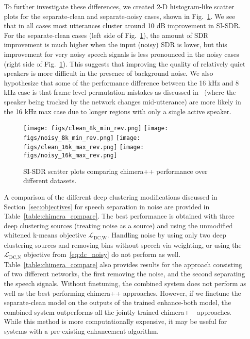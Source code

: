 \documentclass[a4paper]{article}
\begin{document}
To further investigate these differences, we created 2-D histogram-like scatter plots for the separate-clean and separate-noisy cases, shown in Fig.~\ref{fig:scatter}.  We see that in all cases most utterances cluster around 10 dB improvement in SI-SDR.  For the separate-clean cases (left side of Fig.~\ref{fig:scatter}), the amount of SDR improvement is much higher when the input (noisy) SDR is lower, but this improvement for very noisy speech signals is less pronounced in the noisy cases (right side of Fig.~\ref{fig:scatter}).  This suggests that improving the quality of relatively quiet speakers is more difficult in the presence of background noise.  We also hypothesize that some of the performance difference between the 16 kHz and 8 kHz case is that frame-level permutation mistakes as discussed in~\cite{aihara2019teacher} (where the speaker being tracked by the network changes mid-utterance) are more likely in the 16 kHz max case due to longer regions with only a single active speaker.
\begin{figure}[h]
	\centering
		\texttt{[image: figs/clean\_8k\_min\_rev.png]}
		\texttt{[image: figs/noisy\_8k\_min\_rev.png]}
		\texttt{[image: figs/clean\_16k\_max\_rev.png]}
		\texttt{[image: figs/noisy\_16k\_max\_rev.png]}
	\caption{SI-SDR scatter plots comparing chimera++ performance over different datasets.} 
	\label{fig:scatter}
\end{figure}

 
A comparison of the different deep clustering modifications discussed in Section~\ref{sec:objectives} for speech separation in noise are provided in Table~\ref{table:chimera_compare}.  The best performance is obtained with three deep clustering sources (treating noise as a source) and using the unmodified whitened k-means objective $\mathcal{L}_{\text{DC},\text{W}}$.  Handling noise by using only two deep clustering sources and removing bins without speech via weighting, or using the $\mathcal{L}_{\text{DC},\text{N}}$ objective from~\eqref{eq:dc_noisy} do not perform as well.  Table~\ref{table:chimera_compare} also provides results for the approach consisting of two different networks, the first removing the noise, and the second separating the speech signals. Without finetuning, the combined system does not perform as well as the best performing chimera++ approaches. However, if we finetune the separate-clean model on the outputs of the trained enhance-both model, the combined system outperforms all the jointly trained chimera++ approaches.  While this method is more computationally expensive, it may be useful for systems with a pre-existing enhancement algorithm.
\end{document}
